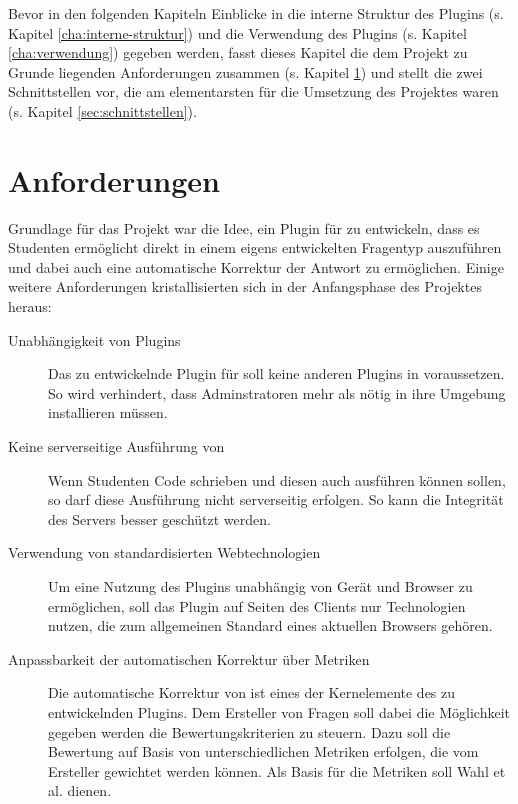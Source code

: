 Bevor in den folgenden Kapiteln Einblicke in die interne Struktur des Plugins (s. Kapitel \ref{cha:interne-struktur}) und die Verwendung des Plugins (s. Kapitel \ref{cha:verwendung}) gegeben werden, fasst dieses Kapitel die dem Projekt zu Grunde liegenden Anforderungen zusammen (s. Kapitel \ref{sec:anforderungen}) und stellt die zwei Schnittstellen vor, die am elementarsten für die Umsetzung des Projektes waren (s. Kapitel \ref{sec:schnittstellen}).

\section{Anforderungen}
\label{sec:anforderungen}

Grundlage für das  Projekt war die Idee, ein Plugin für  zu entwickeln, dass es Studenten ermöglicht  direkt in einem eigens entwickelten Fragentyp auszuführen und dabei auch eine automatische Korrektur der Antwort zu ermöglichen. Einige weitere Anforderungen kristallisierten sich in der Anfangsphase des Projektes heraus:

\begin{description}
    \item[Unabhängigkeit von Plugins] 
    Das zu entwickelnde Plugin für  soll keine anderen Plugins in  voraussetzen. So wird verhindert, dass Adminstratoren mehr als nötig in ihre  Umgebung installieren müssen.
    
    \item[Keine serverseitige Ausführung von ] 
    Wenn Studenten  Code schrieben und diesen auch ausführen können sollen, so darf diese Ausführung nicht serverseitig erfolgen. So kann die Integrität des Servers besser geschützt werden.
    
    \item[Verwendung von standardisierten Webtechnologien] 
    Um eine Nutzung des Plugins unabhängig von Gerät und Browser zu ermöglichen, soll das Plugin auf Seiten des Clients nur Technologien nutzen, die zum allgemeinen Standard eines aktuellen Browsers gehören.
    
    \item[Anpassbarkeit der automatischen Korrektur über Metriken] 
    Die automatische Korrektur von  ist eines der Kernelemente des zu entwickelnden Plugins. Dem Ersteller von Fragen soll dabei die Möglichkeit gegeben werden die Bewertungskriterien zu steuern. Dazu soll die Bewertung auf Basis von unterschiedlichen Metriken erfolgen, die vom Ersteller gewichtet werden können. Als Basis für die Metriken soll  Wahl et al. \cite{WahlAndreas} dienen.
\end{description}


